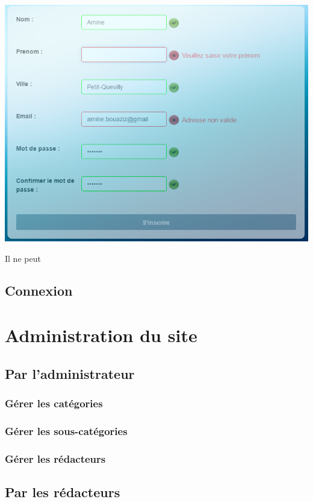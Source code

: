 \documentclass[hidelinks, 12pt,a4paper]{article}
\begin{document}
\begin{center}
\includegraphics[scale=0.8]{images/inscriptionnnvalid.png}\\
\end{center}

Il ne peut 

\subsection{Connexion}

\newpage
\section{Administration du site}
\subsection{Par l'administrateur}
\subsubsection{Gérer les catégories}
\subsubsection{Gérer les sous-catégories}
\subsubsection{Gérer les rédacteurs}

\newpage
\subsection{Par les rédacteurs}
\end{document}

